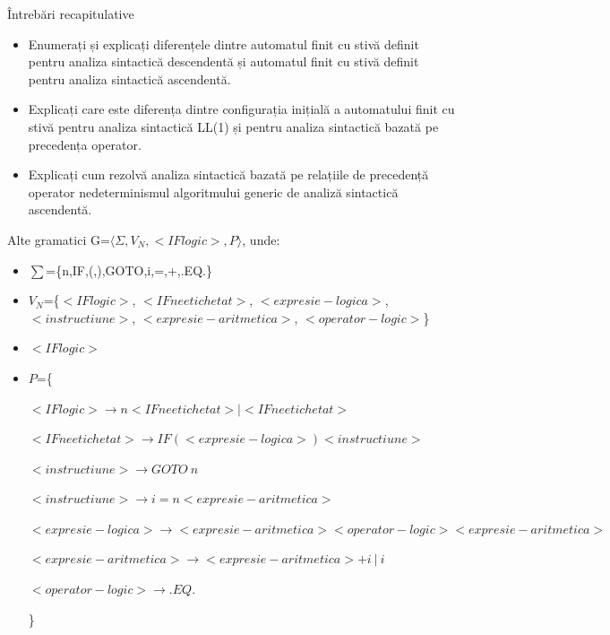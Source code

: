\documentclass[pdf]{beamer}
\begin{document}
\begin{frame}{Întrebări recapitulative}
\begin{itemize}
\item
Enumerați și explicați diferențele dintre automatul finit cu stivă definit pentru analiza sintactică descendentă și automatul finit cu stivă definit pentru analiza sintactică ascendentă.
\newline

\item
Explicați care este diferența dintre configurația inițială a automatului finit cu stivă pentru analiza sintactică LL(1) și pentru analiza sintactică bazată pe precedența operator.
\newline

\item
Explicați cum rezolvă analiza sintactică bazată pe relațiile de precedență operator nedeterminismul algoritmului generic de analiză sintactică ascendentă.
\newline

\end{itemize}
\end{frame}






\begin{frame}{Alte gramatici}
G=$\langle \Sigma, V_N, <IF logic>, P \rangle$, unde:

\begin{itemize}
\item
$\sum$=\{n,IF,(,),GOTO,i,=,+,.EQ.\}
\item
$V_N$=\{$<IF logic>$, $<IF neetichetat>$, $<expresie-logica>$, $<instructiune>$, $<expresie-aritmetica>$, $<operator-logic>$\}
\item
$<IF logic>$
\item
$P$=\{

$<IF logic> \rightarrow n <IF neetichetat> | <IF neetichetat> $

$<IF neetichetat> \rightarrow IF ( <expresie-logica> ) <instructiune>$

$<instructiune> \rightarrow GOTO \ n $

$<instructiune> \rightarrow i =  n <expresie-aritmetica>$

$<expresie-logica> \rightarrow <expresie-aritmetica> <operator-logic> <expresie-aritmetica>$

$<expresie-aritmetica> \rightarrow <expresie-aritmetica> + i \  | \ i$

$<operator-logic> \rightarrow .EQ.$

\}
\end{itemize}

\end{frame}
\end{document}
